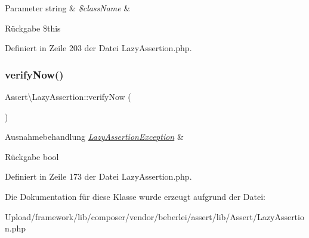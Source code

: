 \begin{DoxyParams}[1]{Parameter}
string & {\em \$class\+Name} & \\
\hline
\end{DoxyParams}
\begin{DoxyReturn}{Rückgabe}
\$this 
\end{DoxyReturn}


Definiert in Zeile 203 der Datei Lazy\+Assertion.\+php.

\mbox{\label{class_assert_1_1_lazy_assertion_a7abbdf397bc9d4ba38644993284ad13b}} 
\subsubsection{\texorpdfstring{verify\+Now()}{verifyNow()}}
{\footnotesize\ttfamily Assert\textbackslash{}\+Lazy\+Assertion\+::verify\+Now (\begin{DoxyParamCaption}{ }\end{DoxyParamCaption})}


\begin{DoxyExceptions}{Ausnahmebehandlung}
{\em \mbox{\hyperlink{class_assert_1_1_lazy_assertion_exception}{Lazy\+Assertion\+Exception}}} & \\
\hline
\end{DoxyExceptions}
\begin{DoxyReturn}{Rückgabe}
bool 
\end{DoxyReturn}


Definiert in Zeile 173 der Datei Lazy\+Assertion.\+php.



Die Dokumentation für diese Klasse wurde erzeugt aufgrund der Datei\+:\begin{DoxyCompactItemize}
\item 
Upload/framework/lib/composer/vendor/beberlei/assert/lib/\+Assert/Lazy\+Assertion.\+php\end{DoxyCompactItemize}
